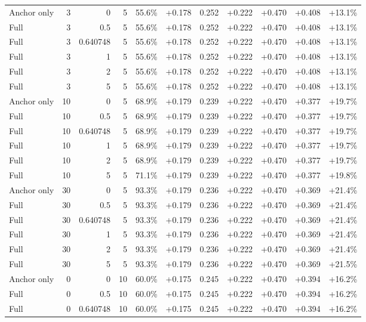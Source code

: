 \begin{table}[htbp]
\begin{tabular}{lrrrccccccc}
Anchor only & 3 & 0 & 5 & 55.6\% & +0.178 & 0.252 & +0.222 & +0.470 & +0.408 & +13.1\% \\
Full & 3 & 0.5 & 5 & 55.6\% & +0.178 & 0.252 & +0.222 & +0.470 & +0.408 & +13.1\% \\
Full & 3 & 0.640748 & 5 & 55.6\% & +0.178 & 0.252 & +0.222 & +0.470 & +0.408 & +13.1\% \\
Full & 3 & 1 & 5 & 55.6\% & +0.178 & 0.252 & +0.222 & +0.470 & +0.408 & +13.1\% \\
Full & 3 & 2 & 5 & 55.6\% & +0.178 & 0.252 & +0.222 & +0.470 & +0.408 & +13.1\% \\
Full & 3 & 5 & 5 & 55.6\% & +0.178 & 0.252 & +0.222 & +0.470 & +0.408 & +13.1\% \\
Anchor only & 10 & 0 & 5 & 68.9\% & +0.179 & 0.239 & +0.222 & +0.470 & +0.377 & +19.7\% \\
Full & 10 & 0.5 & 5 & 68.9\% & +0.179 & 0.239 & +0.222 & +0.470 & +0.377 & +19.7\% \\
Full & 10 & 0.640748 & 5 & 68.9\% & +0.179 & 0.239 & +0.222 & +0.470 & +0.377 & +19.7\% \\
Full & 10 & 1 & 5 & 68.9\% & +0.179 & 0.239 & +0.222 & +0.470 & +0.377 & +19.7\% \\
Full & 10 & 2 & 5 & 68.9\% & +0.179 & 0.239 & +0.222 & +0.470 & +0.377 & +19.7\% \\
Full & 10 & 5 & 5 & 71.1\% & +0.179 & 0.239 & +0.222 & +0.470 & +0.377 & +19.8\% \\
Anchor only & 30 & 0 & 5 & 93.3\% & +0.179 & 0.236 & +0.222 & +0.470 & +0.369 & +21.4\% \\
Full & 30 & 0.5 & 5 & 93.3\% & +0.179 & 0.236 & +0.222 & +0.470 & +0.369 & +21.4\% \\
Full & 30 & 0.640748 & 5 & 93.3\% & +0.179 & 0.236 & +0.222 & +0.470 & +0.369 & +21.4\% \\
Full & 30 & 1 & 5 & 93.3\% & +0.179 & 0.236 & +0.222 & +0.470 & +0.369 & +21.4\% \\
Full & 30 & 2 & 5 & 93.3\% & +0.179 & 0.236 & +0.222 & +0.470 & +0.369 & +21.4\% \\
Full & 30 & 5 & 5 & 93.3\% & +0.179 & 0.236 & +0.222 & +0.470 & +0.369 & +21.5\% \\
Anchor only & 0 & 0 & 10 & 60.0\% & +0.175 & 0.245 & +0.222 & +0.470 & +0.394 & +16.2\% \\
Full & 0 & 0.5 & 10 & 60.0\% & +0.175 & 0.245 & +0.222 & +0.470 & +0.394 & +16.2\% \\
Full & 0 & 0.640748 & 10 & 60.0\% & +0.175 & 0.245 & +0.222 & +0.470 & +0.394 & +16.2\% \\

\end{tabular}
\end{table}
